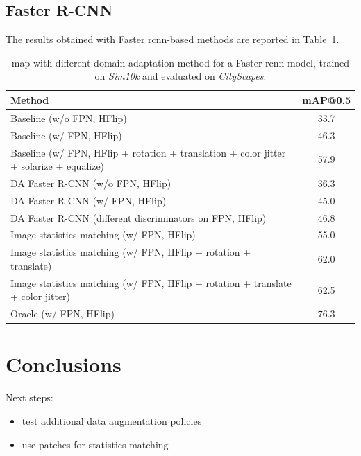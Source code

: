 \documentclass[%
    corpo=12pt,
    twoside,
    stile=classica,   
    tipotesi=magistrale,
    evenboxes,
    english
]{toptesi}
\begin{document}
\section{Faster R-CNN}
The results obtained with Faster \gls{rcnn}-based methods are reported in Table~\ref{table:fasterrcnn}.

\begin{table}[ht!]
	\centering
	\begin{tabularx}{\linewidth}{|X|c|}
		\hline
		Method  &   mAP@0.5 \\
		\hline\hline
		Baseline (w/o FPN, HFlip)       &   33.7\cite{abramov2020simple}   \\
		\hline
		Baseline (w/ FPN, HFlip)       &   46.3   \\
		\hline
		Baseline (w/ FPN, HFlip + rotation + translation + color jitter + solarize + equalize)       &   57.9   \\
		\hline
		DA Faster R-CNN (w/o FPN, HFlip)    & 36.3     \\
		\hline
		DA Faster R-CNN (w/ FPN, HFlip)    & 45.0     \\
 		\hline
 		DA Faster R-CNN (different discriminators on FPN, HFlip)     &   46.8    \\
		\hline
		Image statistics matching (w/ FPN, HFlip)  &   55.0    \\
		\hline
		Image statistics matching (w/ FPN, HFlip + rotation + translate) &   62.0    \\
		\hline
		Image statistics matching (w/ FPN, HFlip + rotation + translate + color jitter) &   62.5    \\
		\hline\hline
		Oracle (w/ FPN, HFlip) &   76.3    \\
		\hline
	\end{tabularx}
	\caption{\gls{map} with different domain adaptation method for a Faster \gls{rcnn} model, trained on \textit{Sim10k} and evaluated on \textit{CityScapes}.}
	\label{table:fasterrcnn}
\end{table}

\chapter{Conclusions}
Next steps:
\begin{itemize}
	\item test additional data augmentation policies
	\item use patches for statistics matching
\end{itemize}

\backmatter
\english
\printbibliography[heading=bibintoc]

\end{document}
